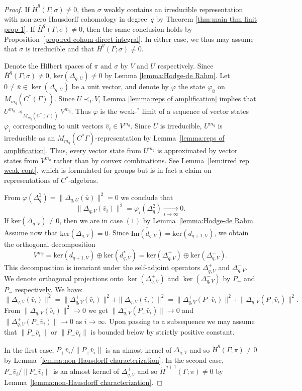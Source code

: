 \documentclass[12pt,reqno]{amsart}
\theoremstyle{definition}
\newcommand{\torH}{\mathring{H}}
\newcommand{\barH}{\bar{H}}
\begin{document}
\begin{proof}
If $\torH^q(\Gamma;\sigma) \ne 0$, then $\sigma$ weakly contains an irreducible representation with non-zero Hausdorff cohomology in degree~$q$ by Theorem \ref{thm:main thm finit prop 1}. 
If $\barH^q(\Gamma;\sigma)\ne 0$, then the same conclusion holds by Proposition~\ref{prop:red cohom direct integral}. 
In either case, we thus may assume that $\sigma$ is irreducible and that $\bar{H}^q(\Gamma;\sigma) \ne 0$. 

Denote the Hilbert spaces of $\pi$ and $\sigma$ by $V$ and $U$ respectively. Since $\bar{H}^{q}(\Gamma;\sigma) \ne 0$, $\mathrm{ker}(\Delta_{q,U}) \neq 0$  by Lemma \ref{lemma:Hodge-de Rahm}. Let $0 \ne \bar{u} \in \ker(\Delta_{q,U})$ be a unit vector, and denote by $\varphi$ the state $\varphi_{\bar{u}}$ on $M_{m_q}(C^*(\Gamma))$. Since $U \prec_\Gamma V$, Lemma \ref{lemma:reps of amplification} implies that $U^{m_q} \prec_{M_{m_q}(C^*(\Gamma))} V^{m_q}$. Thus $\varphi$ is the weak-$^*$ limit of a sequence of vector states $\varphi_i$ corresponding to unit vectors $\bar{v}_i \in V^{m_q}$. Since $U$ is irreducible, $U^{m_q}$ is irreducible as an $M_{m_q}(C^\ast\Gamma)$-representation by Lemma~\ref{lemma:reps of amplification}. Thus, every vector state from $U^{m_q}$ is approximated by vector states from $V^{m_q}$ rather than by convex combinations. See Lemma~\ref{lem:irred rep weak cont}, which is formulated for groups but is in fact a claim on representations of $C^*$-algebras.

From $\varphi(\Delta^2_{q}) =\|\Delta_{q,U}( \bar{u})\|^2= 0$ we conclude that
$$\|\Delta_{q,V}( \bar{v}_i)\|^2 = \varphi_i(\Delta^2_q) \xrightarrow[i \rightarrow \infty]{}0.$$
If $\mathrm{ker}(\Delta_{q,V}) \neq 0$, 
then we are in case $(1)$ by Lemma~\ref{lemma:Hodge-de Rahm}. Assume now that $\mathrm{ker}(\Delta_{q,V}) = 0$. Since $\overline{\mathrm{Im}(d_{q,V})} = \mathrm{ker}(d_{q+1,V})$, we obtain the orthogonal decomposition
\[V^{m_q} = \mathrm{ker}(d_{q+1,V}) \oplus \mathrm{ker}(d^*_{q,V}) = \mathrm{ker}(\Delta_{q,V}^+) \oplus \mathrm{ker}(\Delta_{q,V}^-).\] 
This decomposition is invariant under the self-adjoint operators $\Delta_{q,V}^+$ and $\Delta_{q,V}^-$. We denote orthogonal projections onto $\ker(\Delta_{q,V}^+)$ and $\ker(\Delta_{q,V}^-)$ by $P_+$ and $P_-$ respectively. We have:
$$\|\Delta_{q,V} (\bar{v}_i)\|^2 = \|\Delta_{q,V}^+(\bar{v}_i)\|^2 +\|\Delta_{q,V}^-(\bar{v}_i)\|^2 = \|\Delta_{q,V}^+(P_-\bar{v}_i)\|^2 +\|\Delta_{q,V}^-(P_+\bar{v}_i)\|^2.$$
From $\|\Delta_{q,V}( \bar{v}_i)\|^2 \to 0$ we get $\|\Delta_{q,V}^-(P_+\bar{v}_i)\|\to 0$ and $ \|\Delta_{q,V}^+(P_-\bar{v}_i)\| \to 0$ as $i\to\infty$.
Upon passing to a subsequence we may assume that $\|P_+\bar{v}_i\|$ or $\|P_-\bar{v}_i\|$ is bounded below by strictly positive constant.

In the first case, $P_+\bar{v}_i/\|P_+\bar{v}_i\|$ is an almost kernel of $\Delta_{q,V}^-$ and so $\torH^q(\Gamma;\pi) \ne 0$ by Lemma~\ref{lemma:non-Hausdorff characterization}. In the second case, $P_-\bar{v}_i/\|P_-\bar{v}_i\|$ is an almost kernel of $\Delta_{q,V}^+$ and so $\torH^{q+1}(\Gamma;\pi) \ne 0$ by Lemma~\ref{lemma:non-Hausdorff characterization}. 
\end{proof}
\end{document}
